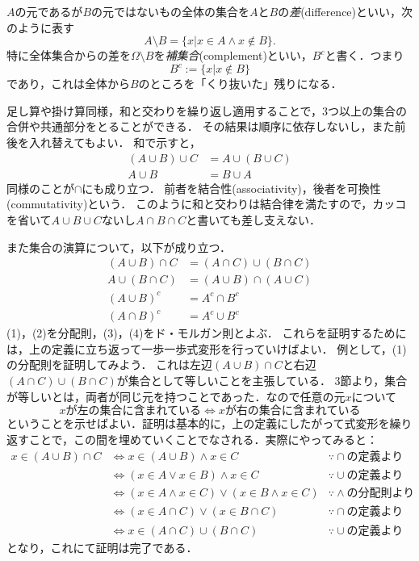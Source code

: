 \documentclass[11pt,a4paper]{jsarticle}
\begin{document}
$A$の元であるが$B$の元ではないもの全体の集合を$A$と$B$の\emph{差}(difference)といい，次のように表す
\[
 A \setminus B = \{ x | x \in A \wedge x \not\in B\}.
\]
特に全体集合からの差を$\Omega \setminus B$を\emph{補集合}(complement)といい，$B^c$と書く．つまり
\[
 B^c := \{ x | x \not\in B\}
\]
であり，これは全体から$B$のところを「くり抜いた」残りになる．

足し算や掛け算同様，和と交わりを繰り返し適用することで，3つ以上の集合の合併や共通部分をとることができる．
その結果は順序に依存しないし，また前後を入れ替えてもよい．
和で示すと，
\begin{align*}
 (A \cup B) \cup C & = A \cup (B \cup C) \\
 A \cup B & = B \cup A
\end{align*}
同様のことが$\cap$にも成り立つ．
前者を結合性(associativity)，後者を可換性(commutativity)という．
このように和と交わりは結合律を満たすので，カッコを省いて$A \cup B \cup C$ないし$A \cap B \cap C$と書いても差し支えない．

また集合の演算について，以下が成り立つ．
\begin{align}
(A \cup B) \cap C &= (A \cap C) \cup (B \cap C) \\
A \cup (B \cap C) &= (A \cup B) \cap (A \cup C) \\
(A \cup B)^c &= A^c \cap B^c \\
(A \cap B)^c &= A^c \cup B^c
\end{align}
(1)，(2)を分配則，(3)，(4)をド・モルガン則とよぶ．
これらを証明するためには，上の定義に立ち返って一歩一歩式変形を行っていけばよい．
例として，(1)の分配則を証明してみよう．
これは左辺$(A \cup B) \cap C$と右辺$(A \cap C) \cup (B \cap C)$が集合として等しいことを主張している．
3節より，集合が等しいとは，両者が同じ元を持つことであった．なので任意の元$x$について
\[
x \text{が左の集合に含まれている}　\iff x \text{が右の集合に含まれている}
\]
ということを示せばよい．証明は基本的に，上の定義にしたがって式変形を繰り返すことで，この間を埋めていくことでなされる．実際にやってみると：
\begin{align*}
x \in (A \cup B) \cap C &\iff x \in (A \cup B) \wedge x \in C  & \because \cap\text{の定義より}\\
&\iff  (x \in A \vee x \in B) \wedge x \in C & \because \cup\text{の定義より} \\
&\iff  (x \in A \wedge x \in C) \vee (x \in B \wedge x \in C) & \because \wedge \text{の分配則より}\\
&\iff  (x \in A \cap C) \vee (x \in B \cap C) & \because \cap\text{の定義より}\\
&\iff  x \in (A \cap C) \cup (B \cap C) & \because \cup\text{の定義より}
\end{align*}
となり，これにて証明は完了である．
\end{document}
